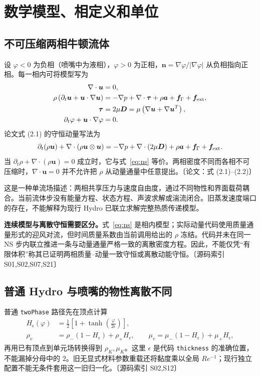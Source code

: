 \documentclass[UTF8,a4paper,11pt,fontset=fandol]{ctexart}
\newcommand{\code}[1]{\nolinkurl{#1}}
\newcommand{\src}[1]{\textcolor{ink}{\small〔源码索引 #1〕}}
\newcommand{\thesis}[1]{\textcolor{ink}{\small〔论文：#1〕}}
\newcommand{\vel}{\bm{u}}
\begin{document}
\section{数学模型、相定义和单位}
\subsection{不可压缩两相牛顿流体}
设 $\varphi<0$ 为负相（喷嘴中为液相），$\varphi>0$ 为正相，$\bm n=\nabla\varphi/|\nabla\varphi|$ 从负相指向正相。每一相内可将模型写为
\begin{align}
 \nabla\cdot\vel &=0,\label{eq:mass}\\
 \rho\left(\partial_t\vel+\vel\cdot\nabla\vel\right)
 &=-\nabla p+\nabla\cdot\bm\tau+\rho\bm a+\bm f_\Gamma+\bm f_{\rm ext},\label{eq:ns}\\
 \bm\tau&=2\mu\bm D=\mu\left(\nabla\vel+\nabla\vel^T\right),\\
 \partial_t\varphi+\vel\cdot\nabla\varphi&=0.\label{eq:ls}
\end{align}
论文式 (2.1) 的守恒动量写法为
\begin{equation}
 \partial_t(\rho\vel)+\nabla\cdot(\rho\vel\otimes\vel)
 =-\nabla p+\nabla\cdot(2\mu\bm D)+\rho\bm a+\bm f_\Gamma+\bm f_{\rm ext}.
\end{equation}
当 $\partial_t\rho+\nabla\cdot(\rho\vel)=0$ 成立时，它与式~\eqref{eq:ns} 等价。两相密度不同而各相不可压缩时，$\nabla\cdot\vel=0$ 并不允许把 $\rho$ 从动量通量中任意提出。\thesis{式 (2.1)--(2.2)}

这是一种单流场描述：两相共享压力与速度自由度，通过不同物性和界面载荷耦合。当前流体步没有能量方程、状态方程、声波求解或湍流闭合。旧蒸发速度端口的存在，不能解释为现行 Hydro 已联立求解完整热质传递模型。

\textbf{连续模型与离散守恒需要区分。}式~\eqref{eq:ns} 是相内模型；实际动量代码使用质量通量形式的迎风对流，但时间质量系数由当前调用给出的 $\rho$ 冻结。代码并未在同一 NS 步内联立推进一条与动量通量严格一致的离散密度方程。因此，不能仅凭“有限体积”称其已证明两相质量--动量一致守恒或离散动能守恒。\src{S01,S02,S07,S21}

\subsection{普通 Hydro 与喷嘴的物性离散不同}
普通 \code{twoPhase} 路径先在顶点计算
\begin{align}
 H_\epsilon(\varphi)&=\tfrac12\left[1+\tanh\left(\frac{\varphi}{2\epsilon}\right)\right],\\
 \rho_v&=\rho_-(1-H_\epsilon)+\rho_+H_\epsilon,\qquad
 \mu_v=\mu_-(1-H_\epsilon)+\mu_+H_\epsilon,
\end{align}
再用已有顶点到单元场转换得到 $\rho_K,\mu_K$。这里 $\epsilon$ 是代码 \code{thickness} 的准确位置，不能漏掉分母中的 $2$。旧无显式材料参数重载还将黏度乘以全局 $Re^{-1}$；现行独立配置不能无条件套用这一旧归一化。\src{S02,S12}
\end{document}
